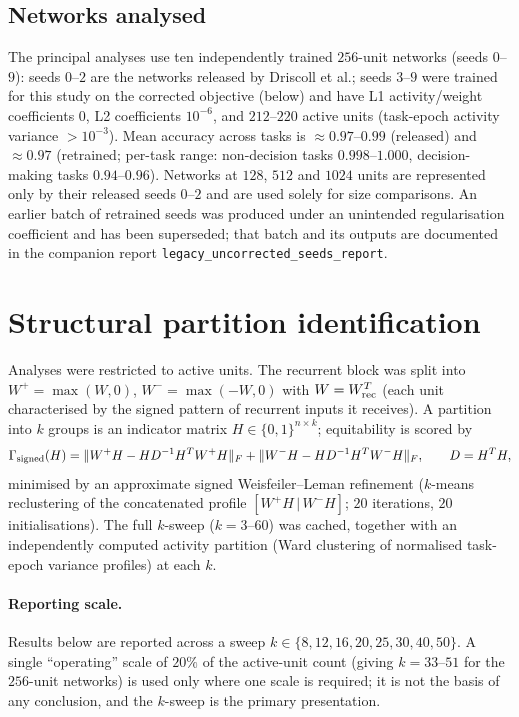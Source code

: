 \documentclass[11pt]{article}
\begin{document}
\subsection{Networks analysed}
\label{sec:nets}
The principal analyses use ten independently trained $256$-unit networks (seeds $0$--$9$): seeds
$0$--$2$ are the networks released by Driscoll et al.; seeds $3$--$9$ were trained for this study
on the corrected objective (below) and have L1 activity/weight coefficients $0$, L2 coefficients
$10^{-6}$, and $212$--$220$ active units (task-epoch activity variance $>10^{-3}$). Mean accuracy
across tasks is $\approx0.97$--$0.99$ (released) and $\approx0.97$ (retrained; per-task range:
non-decision tasks $0.998$--$1.000$, decision-making tasks $0.94$--$0.96$). Networks at $128$,
$512$ and $1024$ units are represented only by their released seeds $0$--$2$ and are used solely
for size comparisons. An earlier batch of retrained seeds was produced under an unintended
regularisation coefficient and has been superseded; that batch and its outputs are documented in
the companion report \texttt{legacy\_uncorrected\_seeds\_report}.

\section{Structural partition identification}
\label{sec:partition}
Analyses were restricted to active units. The recurrent block was split into
$W^{+}=\max(W,0)$, $W^{-}=\max(-W,0)$ with $W=W_{\rm rec}^{T}$ (each unit characterised by the
signed pattern of recurrent inputs it receives). A partition into $k$ groups is an indicator
matrix $H\in\{0,1\}^{n\times k}$; equitability is scored by
\[
\Gamma_{\rm signed}(H)=\lVert W^{+}H-HD^{-1}H^{T}W^{+}H\rVert_{F}
+\lVert W^{-}H-HD^{-1}H^{T}W^{-}H\rVert_{F},\qquad D=H^{T}H,
\]
minimised by an approximate signed Weisfeiler--Leman refinement ($k$-means reclustering of the
concatenated profile $[W^{+}H\,|\,W^{-}H]$; $20$ iterations, $20$ initialisations). The full
$k$-sweep ($k=3$--$60$) was cached, together with an independently computed activity partition
(Ward clustering of normalised task-epoch variance profiles) at each $k$.

\paragraph{Reporting scale.} Results below are reported across a sweep $k\in\{8,12,16,20,25,30,
40,50\}$. A single ``operating'' scale of $20\%$ of the active-unit count (giving $k=33$--$51$
for the $256$-unit networks) is used only where one scale is required; it is not the basis of any
conclusion, and the $k$-sweep is the primary presentation.
\end{document}
